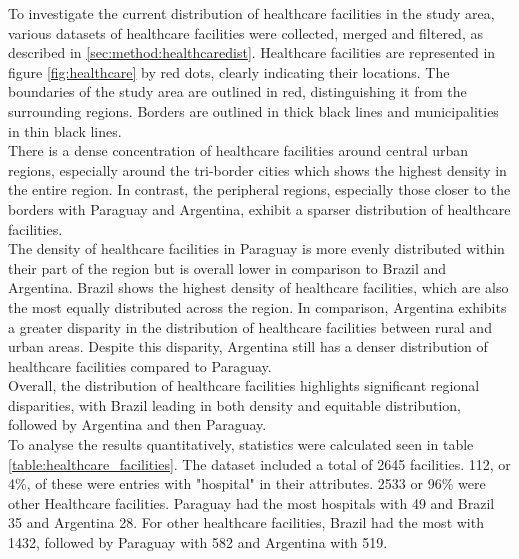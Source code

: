 \documentclass[11pt, a4paper]{report}
\begin{document}
To investigate the current distribution of healthcare facilities in the study area, various datasets of healthcare facilities were collected, merged and filtered, as described in \ref{sec:method:healthcaredist}. Healthcare facilities are represented in figure \ref{fig:healthcare} by red dots, clearly indicating their locations. The boundaries of the study area are outlined in red, distinguishing it from the surrounding regions. Borders are outlined in thick black lines and municipalities in thin black lines. \\
%
There is a dense concentration of healthcare facilities around central urban regions, especially around the tri-border cities which shows the highest density in the entire region. In contrast, the peripheral regions, especially those closer to the borders with Paraguay and Argentina, exhibit a sparser distribution of healthcare facilities. \\
%
The density of healthcare facilities in Paraguay is more evenly distributed within their part of the region but is overall lower in comparison to Brazil and Argentina. Brazil shows the highest density of healthcare facilities, which are also the most equally distributed across the region. In comparison, Argentina exhibits a greater disparity in the distribution of healthcare facilities between rural and urban areas. Despite this disparity, Argentina still has a denser distribution of healthcare facilities compared to Paraguay. \\
% 
Overall, the distribution of healthcare facilities highlights significant regional disparities, with Brazil leading in both density and equitable distribution, followed by Argentina and then Paraguay. \\
%
To analyse the results quantitatively, statistics were calculated seen in table \ref{table:healthcare_facilities}. The dataset included a total of 2645 facilities. 112, or 4\%, of these were entries with "hospital" in their attributes. 2533 or 96\% were other Healthcare facilities. Paraguay had the most hospitals with 49 and Brazil 35 and Argentina 28. For other healthcare facilities, Brazil had the most with 1432, followed by Paraguay with 582 and Argentina with 519. 
\end{document}
